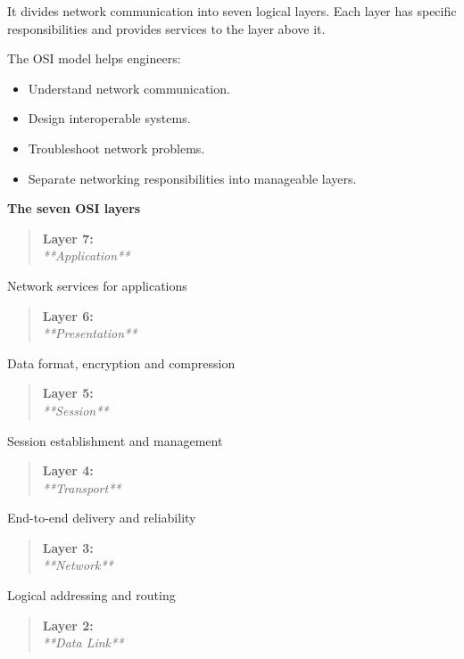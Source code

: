 It divides network communication into seven logical layers. Each layer has specific responsibilities and provides services to the layer above it.

The OSI model helps engineers:

\begin{itemize}
    \item Understand network communication.
    \item Design interoperable systems.
    \item Troubleshoot network problems.
    \item Separate networking responsibilities into manageable layers.
\end{itemize}

\textbf{The seven OSI layers}

\begin{quote}
\textbf{Layer 7: }\\[2pt]
\textit{**Application**}
\end{quote}

Network services for applications

\begin{quote}
\textbf{Layer 6: }\\[2pt]
\textit{**Presentation**}
\end{quote}

Data format, encryption and compression

\begin{quote}
\textbf{Layer 5: }\\[2pt]
\textit{**Session**}
\end{quote}

Session establishment and management

\begin{quote}
\textbf{Layer 4: }\\[2pt]
\textit{**Transport**}
\end{quote}

End-to-end delivery and reliability

\begin{quote}
\textbf{Layer 3: }\\[2pt]
\textit{**Network**}
\end{quote}

Logical addressing and routing

\begin{quote}
\textbf{Layer 2: }\\[2pt]
\textit{**Data Link**}
\end{quote}

